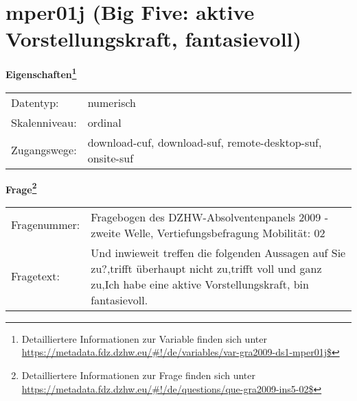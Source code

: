 
    \setcounter{footnote}{0}

    \vspace*{-1.8cm}
	\section{mper01j (Big Five: aktive Vorstellungskraft, fantasievoll)}
	\label{section:mper01j}



    \vspace*{0.5cm}
    \noindent\textbf{Eigenschaften\footnote{Detailliertere Informationen zur Variable finden sich unter
		\url{https://metadata.fdz.dzhw.eu/\#!/de/variables/var-gra2009-ds1-mper01j$}}}\\
	\begin{tabularx}{\hsize}{@{}lX}
	Datentyp: & numerisch \\
	Skalenniveau: & ordinal \\
	Zugangswege: &
	  download-cuf, 
	  download-suf, 
	  remote-desktop-suf, 
	  onsite-suf
 \\
    \end{tabularx}



				\vspace*{0.5cm}
                \noindent\textbf{Frage\footnote{Detailliertere Informationen zur Frage finden sich unter
		              \url{https://metadata.fdz.dzhw.eu/\#!/de/questions/que-gra2009-ins5-02$}}}\\
				\begin{tabularx}{\hsize}{@{}lX}
					Fragenummer: &
					  Fragebogen des DZHW-Absolventenpanels 2009 - zweite Welle, Vertiefungsbefragung Mobilität:
					  02
 \\
					Fragetext: & Und inwieweit treffen die folgenden Aussagen auf Sie zu?,trifft überhaupt nicht zu,trifft voll und ganz zu,Ich habe eine aktive Vorstellungskraft, bin fantasievoll. \\
				\end{tabularx}





